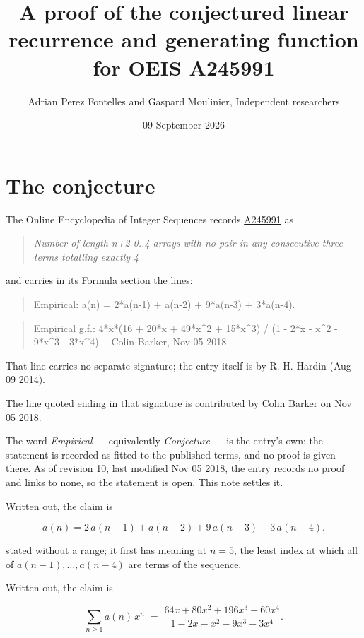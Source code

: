 \documentclass[11pt]{article}
\title{A proof of the conjectured linear recurrence and generating function for OEIS A245991}
\author{Adrian Perez Fontelles and Gaspard Moulinier, Independent researchers}
\date{09 September 2026}
\theoremstyle{definition}
\begin{document}
\maketitle
\section{The conjecture}

The Online Encyclopedia of Integer Sequences records \href{https://oeis.org/A245991}{A245991} as

\begin{quote}\itshape Number of length n+2 0..4 arrays with no pair in any consecutive three terms totalling exactly 4\end{quote}

and carries in its Formula section the lines:

\begin{quote}\ttfamily Empirical: a(n) = 2*a(n-1) + a(n-2) + 9*a(n-3) + 3*a(n-4).\end{quote}

\begin{quote}\ttfamily Empirical g.f.: 4*x*(16 + 20*x + 49*x\textasciicircum{}2 + 15*x\textasciicircum{}3) / (1 - 2*x - x\textasciicircum{}2 - 9*x\textasciicircum{}3 - 3*x\textasciicircum{}4). - Colin Barker, Nov 05 2018\end{quote}

That line carries no separate signature; the entry itself is by R. H. Hardin (Aug 09 2014).

The line quoted ending in that signature is contributed by Colin Barker on Nov 05 2018.

The word {\itshape Empirical} --- equivalently {\itshape Conjecture} --- is the entry's own: the statement is recorded as fitted to the published terms, and no proof is given there. As of revision 10, last modified Nov 05 2018, the entry records no proof and links to none, so the statement is open. This note settles it.

Written out, the claim is

\[a(n) = 2\,a(n-1) + a(n-2) + 9\,a(n-3) + 3\,a(n-4).\]

stated without a range; it first has meaning at $n = 5$, the least index at which all of $a(n-1),\dots,a(n-4)$ are terms of the sequence.

Written out, the claim is

\[\sum_{n \ge 1} a(n)\,x^n \;=\; \frac{64x + 80x^{2} + 196x^{3} + 60x^{4}}{1 - 2x - x^{2} - 9x^{3} - 3x^{4}}.\]
\end{document}
